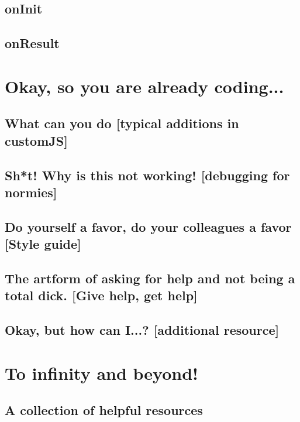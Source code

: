 \documentclass[11pt,a4paper,oldfontcommands]{memoir}
\begin{document}
    \section{onInit}
    \label{sec:onInit}
    
    
    \section{onResult}
    \label{sec:onResult}
    

\chapter{Okay, so you are already coding...}
    \label{chap:coding}

    \section{What can you do \small{[typical additions in customJS]}}
    \label{sec:whatDo}
    
    
    \section{Sh*t! Why is this not working! \small{[debugging for normies]}}
    \label{sec:debug}
    
    
    \section{Do yourself a favor, do your colleagues a favor \small{[Style guide]}}
    \label{sec:style}
    
    
    \section{The artform of asking for help and not being a total dick. \small{[Give help, get help]}}
    \label{sec:help}
    
    

\section{Okay, but how can I...? \small{[additional resource]}}


\appendix

\chapter{To infinity and beyond!}
\section{A collection of helpful resources}




\end{document}

